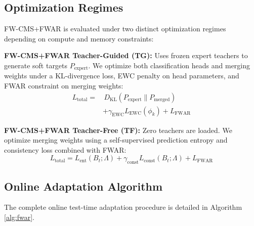 \documentclass{article}
\begin{document}
\subsection{Optimization Regimes}
FW-CMS+FWAR is evaluated under two distinct optimization regimes depending on compute and memory constraints:

\textbf{FW-CMS+FWAR Teacher-Guided (TG):} Uses frozen expert teachers to generate soft targets $P_{\text{expert}}$. We optimize both classification heads and merging weights under a KL-divergence loss, EWC penalty on head parameters, and FWAR constraint on merging weights:
\begin{equation}
\begin{aligned}
    L_{\text{total}} = & \, D_{\text{KL}}(P_{\text{expert}} \parallel P_{\text{merged}}) \\
    & + \gamma_{\text{EWC}} L_{\text{EWC}}(\phi_k) + L_{\text{FWAR}}
\end{aligned}
\end{equation}

\textbf{FW-CMS+FWAR Teacher-Free (TF):} Zero teachers are loaded. We optimize merging weights using a self-supervised prediction entropy and consistency loss combined with FWAR:
\begin{equation}
    L_{\text{total}} = L_{\text{ent}}(B_t; \Lambda) + \gamma_{\text{const}} L_{\text{const}}(B_t; \Lambda) + L_{\text{FWAR}}
\end{equation}

\subsection{Online Adaptation Algorithm}
The complete online test-time adaptation procedure is detailed in Algorithm \ref{alg:fwar}.
\end{document}
